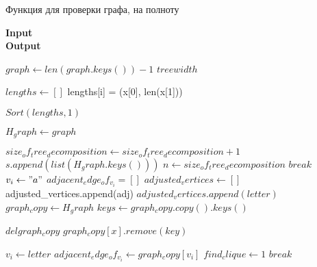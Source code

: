   \begin{algorithm}
  \caption{Функция для проверки графа, на полноту}\label{Жадный алгоритм}
  \begin{algorithmic}[1]
      \hspace*{\algorithmicindent} \textbf{Input} \\
      \hspace*{\algorithmicindent} \textbf{Output} 

          \State $graph \gets len(graph.keys()) - 1$
          \Return $treewidth$
      \EndIf

      \State $lengths \gets []$ 
          lengths[i] = (x[0], len(x[1]))
      \EndFor

      $Sort(lengths, 1)$

      \State $H_graph \gets graph$

          \State $size_of_tree_decomposition \gets size_of_tree_decomposition + 1$
              \State $s.append(list(H_graph.keys()))$
              \State $n \gets size_of_tree_decomposition$
              \State $break$
          \Else
              \State $v_i \gets "a"$
              \State $adjacent_edge_of_v_i = []$
                  \State $adjusted_vertices \gets []$
                          adjusted_vertices.append(adj)
                      \EndFor
                  \EndIf
                  \State $adjusted_vertices.append(letter)$
                  \State $graph_copy \gets H_graph$
                  \State $keys \gets graph_copy.copy().keys()$

                          \State $del graph_copy$
                                  \State $graph_copy[x].remove(key)$
                              \EndIf
                          \EndFor
                      \EndIf
                  \EndFor

                      \State $v_i \gets letter$
                      \State $adjacent_edge_of_v_i \gets graph_copy[v_i]$
                      \State $find_clique \gets 1$
                      \State $break$
                  \EndIf
              \EndFor


\end{algorithmic}
\end{algorithm}
